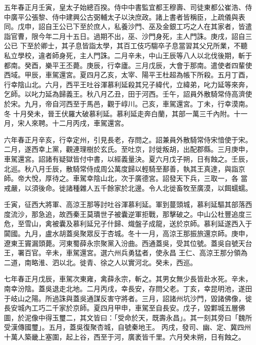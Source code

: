 \begin{pinyinscope}
 五年春正月壬寅，皇太子始總百揆。侍中中書監宜都王穆壽、司徒東都公崔浩、侍中廣平公張黎、侍中建興公古弼輔太子以決庶政。諸上書者皆稱臣，上疏儀與表同。戊申，詔自王公已下至於庶人，私養沙門、巫及金銀工巧之人在其家者，皆遣詣官曹，限今年二月十五日。過期不出，巫、沙門身死，主人門誅。庚戌，詔自三公已
 下至於卿士，其子息皆詣太學，其百工伎巧騶卒子息當習其父兄所業，不聽私立學校，違者師身死，主人門誅。二月辛未，中山王辰等八人以北伐後期，斬于都南。癸酉，樂平王丕薨。庚辰，行幸廬。三月戊辰，大會于那南。遣使者四輩使西域。甲辰，車駕還宮。夏四月乙亥，太宰、陽平王杜超為帳下所殺。五月丁酉，行幸陰山北。六月，西平王吐谷渾慕利延殺其兄子緯代，立緯弟，叱力延等來奔，乞師。以叱力延為歸義王。秋八月乙丑，田于河西。壬午，詔員外散騎常侍高濟使於宋。九月，帝自河西至于馬邑，觀于崞川。己亥，車駕還宮。丁未，行幸漠南。冬
 十月癸未，晉王伏羅大破慕利延。慕利延走奔白蘭，其部一萬三千內附。十一月，宋人來聘。十二月丙戌，車駕還宮。



 六年春正月辛亥，行幸定州，引見長老，存問之。詔兼員外散騎常侍宋愔使于宋。二月，遂西幸上黨，觀連理樹於玄氏。至吐京，討徙叛胡，出配郡縣。三月庚申，車駕還宮。詔諸有疑獄皆付中書，以經義量決。夏六月戊子朔，日有蝕之。壬辰，北巡。秋八月壬辰，散騎常侍成周公萬度歸以輕騎至鄯善，執其王真達，與詣京師。帝大悅，厚待之。車駕幸陰山北，次于廣德宮。詔發天下兵，三取一，各
 當戒嚴，以須後命。徙諸種雜人五千餘家於北邊。令人北徙畜牧至廣漠，以餌蠕蠕。



 壬寅，征西大將軍、高涼王那等討吐谷渾慕利延。軍到蔓頭城，慕利延驅其部落西度流沙，那急追，故西秦王莫璝世子被囊逆軍拒戰，那擊破之。中山公杜豐追度三危，至雪山，禽被囊及慕利延兄子什歸、熾盤子成龍，送於京師。慕利延遂西入于闐國。九月，盧水胡蓋吳聚眾反于杏城。冬十一月，高涼王那振旅還京師。庚申，遼東王竇漏頭薨。河東蜀薛永宗聚黨入汾曲。西通蓋吳，受其位號。蓋吳自號天台王，署百官。辛未，車駕還宮。選六州兵勇猛者，使永昌
 王仁、高涼王那分領為二道，南略淮、泗以北。徙青、徐之人以實河北。癸未，西巡。



 七年春正月戊辰，車駕次東雍，禽薛永宗，斬之。其男女無少長皆赴水死。辛未，南幸汾陰。蓋吳退走北地。二月丙戌，幸長安，存問父老。丁亥，幸昆明池，遂田于岐山之陽。所過誅與蓋吳通謀反害守將者。三月，詔諸州坑沙門，毀諸佛像，徙長安城內工巧二千家於京師。夏四月甲申，車駕至自長安。戊子，毀鄴城五層佛圖，於泥像中得玉璽二，其文皆曰：「受命於天，既壽永昌」。其一刻其旁曰「魏所受漢傳國璽」。五月，蓋吳復聚杏城，自號秦地王。
 丙戌，發司、幽、定、冀四州十萬人築畿上塞圍，起上谷，西至于河，廣袤皆千里。六月癸未朔，日有蝕之。




\end{pinyinscope}
